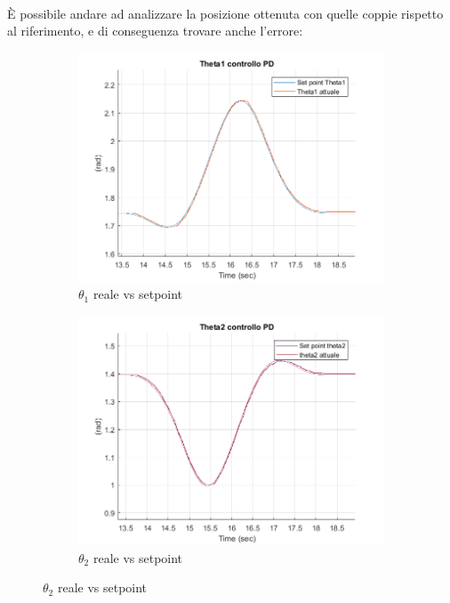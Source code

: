 \\È possibile andare ad analizzare la posizione ottenuta con quelle coppie rispetto al riferimento, e di conseguenza trovare anche l'errore:
\begin{figure}[!ht]
\begin{subfigure}{.5\textwidth}
  \centering
  \includegraphics[width=1\linewidth]{Immagini/Traiettorie/Theta1PD}  
  \caption{$\theta_1$ reale vs setpoint}
  \label{fig:sub-pd1p}
\end{subfigure}
\begin{subfigure}{.5\textwidth}
  \centering
  \includegraphics[width=1\linewidth]{Immagini/Traiettorie/Theta2PD}  
  \caption{$\theta_2$ reale vs setpoint}

\end{subfigure}
\end{figure}
